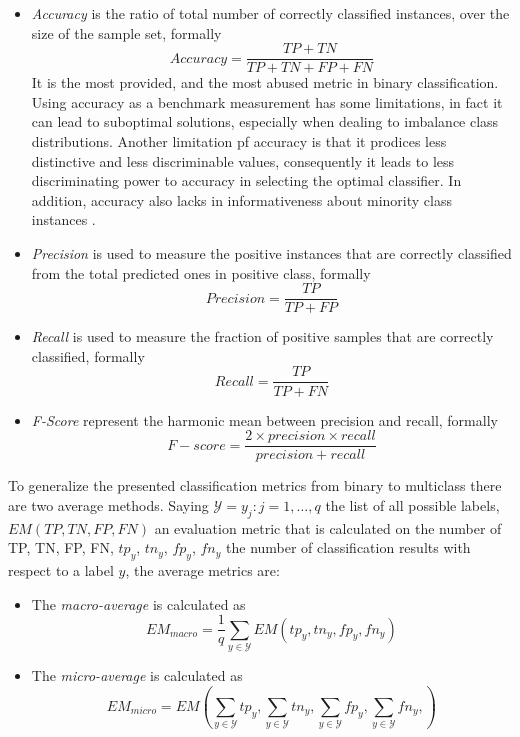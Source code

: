 \begin{itemize}
	\item \textit{Accuracy} is the ratio of total number of correctly classified instances, over the size of the sample set, formally
	\[ Accuracy = \frac{TP + TN}{TP + TN + FP + FN} \]
	It is the most provided, and the most abused metric in binary classification. Using accuracy as a benchmark measurement has some limitations, in fact it can lead to suboptimal solutions, especially when dealing to imbalance class distributions. Another limitation pf accuracy is that it prodices less distinctive and less discriminable values, consequently it leads to less discriminating power to accuracy in selecting the optimal classifier. In addition, accuracy also lacks in informativeness about minority class instances \cite{article-ev-metrics}.
	
	\item \textit{Precision} is used to measure the positive instances that are correctly classified from the total predicted ones in positive class, formally
	\[ Precision = \frac{TP}{TP + FP} \]
	
	\item \textit{Recall} is used to measure the fraction of positive samples that are correctly classified, formally
	\[ Recall = \frac{TP}{TP + FN} \]
	
	\item \textit{F-Score} represent the harmonic mean between precision and recall, formally
	\[ F-score = \frac{2 \times precision \times recall}{precision + recall} \]
\end{itemize}

To generalize the presented classification metrics from binary to multiclass there are two average methods. Saying $\mathcal{Y}={y_j : j = 1, \dots, q}$ the list of all possible labels, $EM(TP, TN, FP, FN)$ an evaluation metric that is calculated on the number of \ac{TP}, \ac{TN}, \ac{FP}, \ac{FN}, $tp_y$, $tn_y$, $fp_y$, $fn_y$ the number of classification results with respect to a label $y$, the average metrics are:

\begin{itemize}
	\item The \textit{macro-average} is calculated as
	\[ EM_{macro} = \frac{1}{q} \sum_{y \in \mathcal{Y}} EM(tp_y, tn_y, fp_y, fn_y) \]
	
	\item The \textit{micro-average} is calculated as
	\[ EM_{micro} = EM \left( \sum_{y \in \mathcal{Y}} tp_y, \sum_{y \in \mathcal{Y}} tn_y, \sum_{y \in \mathcal{Y}} fp_y, \sum_{y \in \mathcal{Y}} fn_y,  \right) \]
\end{itemize}

